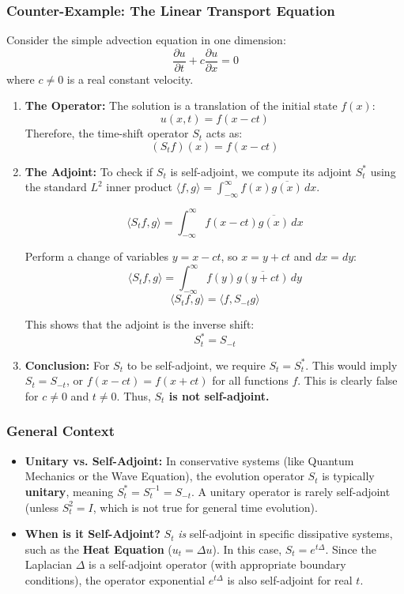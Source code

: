 \documentclass[oneside]{book}
\begin{document}
\subsubsection*{Counter-Example: The Linear Transport Equation}

Consider the simple advection equation in one dimension:
\[ \frac{\partial u}{\partial t} + c \frac{\partial u}{\partial x} = 0 \]
where $c \neq 0$ is a real constant velocity.

\begin{enumerate}
    \item \textbf{The Operator:} The solution is a translation of the initial state $f(x)$:
    \[ u(x,t) = f(x - ct) \]
    Therefore, the time-shift operator $S_t$ acts as:
    \[ (S_t f)(x) = f(x - ct) \]

    \item \textbf{The Adjoint:} To check if $S_t$ is self-adjoint, we compute its adjoint $S_t^*$ using the standard $L^2$ inner product $\langle f, g \rangle = \int_{-\infty}^{\infty} f(x) \overline{g(x)} \, dx$.

    \[ \langle S_t f, g \rangle = \int_{-\infty}^{\infty} f(x - ct) \overline{g(x)} \, dx \]

    Perform a change of variables $y = x - ct$, so $x = y + ct$ and $dx = dy$:
    \[ \langle S_t f, g \rangle = \int_{-\infty}^{\infty} f(y) \overline{g(y + ct)} \, dy \]
    \[ \langle S_t f, g \rangle = \langle f, S_{-t} g \rangle \]

    This shows that the adjoint is the inverse shift:
    \[ S_t^* = S_{-t} \]

    \item \textbf{Conclusion:} For $S_t$ to be self-adjoint, we require $S_t = S_t^*$. This would imply $S_t = S_{-t}$, or $f(x - ct) = f(x + ct)$ for all functions $f$. This is clearly false for $c \neq 0$ and $t \neq 0$. Thus, \textbf{$S_t$ is not self-adjoint.}
\end{enumerate}

\subsubsection*{General Context}

\begin{itemize}
    \item \textbf{Unitary vs. Self-Adjoint:} In conservative systems (like Quantum Mechanics or the Wave Equation), the evolution operator $S_t$ is typically \textbf{unitary}, meaning $S_t^* = S_t^{-1} = S_{-t}$. A unitary operator is rarely self-adjoint (unless $S_t^2 = I$, which is not true for general time evolution).
    \item \textbf{When is it Self-Adjoint?} $S_t$ \textit{is} self-adjoint in specific dissipative systems, such as the \textbf{Heat Equation} ($u_t = \Delta u$). In this case, $S_t = e^{t\Delta}$. Since the Laplacian $\Delta$ is a self-adjoint operator (with appropriate boundary conditions), the operator exponential $e^{t\Delta}$ is also self-adjoint for real $t$.
\end{itemize}
\end{document}
